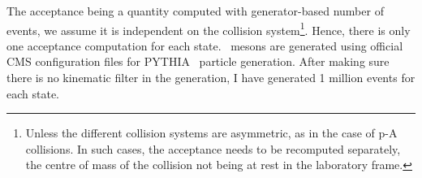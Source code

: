 The acceptance being a quantity computed with generator-based number
of events, we
assume it is independent on the collision system\footnote{Unless the
 different collision systems are asymmetric, as in the case of p-A collisions. In such cases, the acceptance needs to be recomputed
 separately, the centre of mass of the collision not being at rest in
 the laboratory frame.}. Hence, there is only one acceptance
computation for each state. \PgU\ mesons are generated using official CMS
configuration files for PYTHIA~\cite{Sjostrand:2006za} particle
generation. After making sure there is no
kinematic filter in the generation, I have generated 1 million events for each state.%




